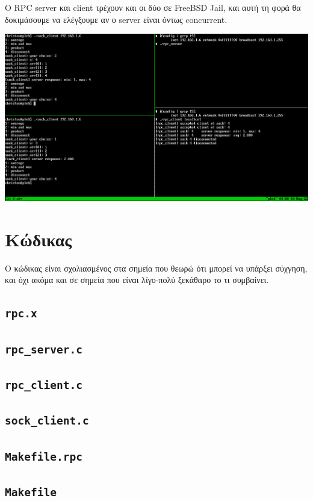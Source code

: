 \documentclass{article}
\begin{document}
Ο RPC server και client τρέχουν και οι δύο σε FreeBSD Jail, και αυτή τη φορά θα
δοκιμάσουμε να ελέγξουμε αν ο server είναι όντως concurrent.

\includegraphics[width=\linewidth]{res/concur.png}

\section{Κώδικας}

Ο κώδικας είναι σχολιασμένος στα σημεία που θεωρώ ότι μπορεί να υπάρξει
σύχγηση, και όχι ακόμα και σε σημεία που είναι λίγο-πολύ ξεκάθαρο το τι
συμβαίνει.

\subsection{\lstinline{rpc.x}}


\pagebreak

\subsection{\lstinline{rpc_server.c}}


\pagebreak

\subsection{\lstinline{rpc_client.c}}


\pagebreak

\subsection{\lstinline{sock_client.c}}


\pagebreak

\subsection{\lstinline{Makefile.rpc}}


\pagebreak

\subsection{\lstinline{Makefile}}


\pagebreak
\end{document}
